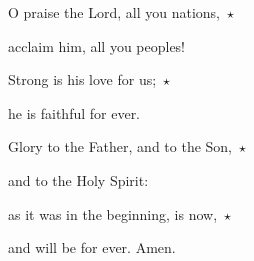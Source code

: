 \noindent O praise the Lord, all you nations,~$\star$~\nopagebreak

acclaim him, all you peoples!

\noindent Strong is his love for us;~$\star$~\nopagebreak

he is faithful for ever.

\noindent Glory to the Father, and to the Son,~$\star$~\nopagebreak

and to the Holy Spirit:

\noindent as it was in the beginning, is now,~$\star$~\nopagebreak

and will be for ever. Amen.
